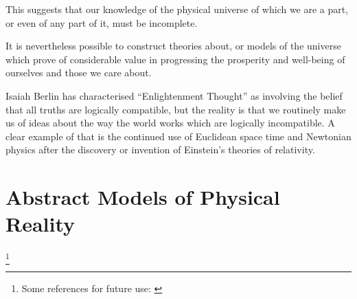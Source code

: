 \documentclass[10pt,titlepage]{book}
\begin{document}
This suggests that our knowledge of the physical universe of which we are a part, or even of any part of it, must be incomplete.

It is nevertheless possible to construct theories about, or models of the universe which prove of considerable value in progressing the prosperity and well-being of ourselves and those we care about.

Isaiah Berlin has characterised ``Enlightenment Thought'' as involving the belief that all truths are logically compatible, but the reality is that we routinely make us of ideas about the way the world works which are logically incompatible.
A clear example of that is the continued use of Euclidean space time and Newtonian physics after the discovery or invention of Einstein's theories of relativity.

\chapter{Abstract Models of Physical Reality}

\footnote{Some references for future use:
\cite{arthan1991formal}
\cite{beeson2012foundations}
\cite{centrone2019reflections}
\cite{dzamonja2019}
\cite{gettier1963justified}
\cite{jones1992a,jones1992b}
\cite{kline1990mathematical1}
\cite{kline1990mathematical2}
\cite{kline1990mathematical3}
\cite{kumar2016self}
\cite{oliveira2006unifying}
\cite{shapiro1991foundations}
\cite{shapiroHPML}
\cite{tarski31}
\cite{tarski56}
}

{}


\end{document}
